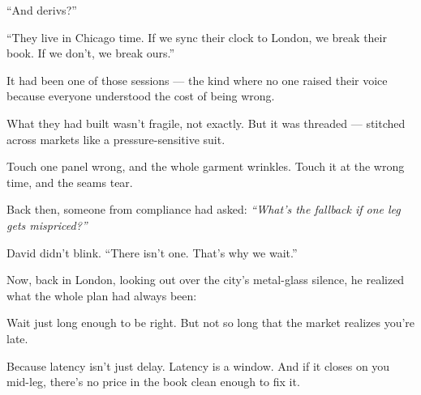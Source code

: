 “And derivs?”

“They live in Chicago time. If we sync their clock to London, we break their book. If we don’t, 
we break ours.”

It had been one of those sessions — the kind where no one raised their voice because everyone 
understood the cost of being wrong.

What they had built wasn’t fragile, not exactly.
But it was threaded — stitched across markets like a pressure-sensitive suit.

Touch one panel wrong, and the whole garment wrinkles.
Touch it at the wrong time, and the seams tear.

Back then, someone from compliance had asked:
\textit{“What’s the fallback if one leg gets mispriced?”}

David didn’t blink.
“There isn’t one. That’s why we wait.”

Now, back in London, looking out over the city’s metal-glass silence,
he realized what the whole plan had always been:

Wait just long enough to be right.
But not so long that the market realizes you’re late.

Because latency isn’t just delay.
Latency is a window.
And if it closes on you mid-leg,
there’s no price in the book clean enough to fix it.




